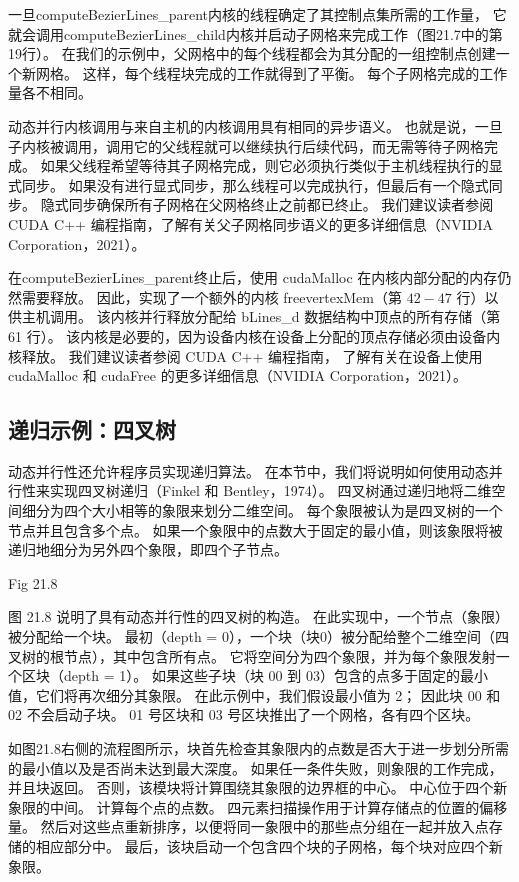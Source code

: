 一旦computeBezierLines\_parent内核的线程确定了其控制点集所需的工作量，
它就会调用computeBezierLines\_child内核并启动子网格来完成工作（图21.7中的第19行）。 
在我们的示例中，父网格中的每个线程都会为其分配的一组控制点创建一个新网格。 这样，每个线程块完成的工作就得到了平衡。 
每个子网格完成的工作量各不相同。

动态并行内核调用与来自主机的内核调用具有相同的异步语义。 
也就是说，一旦子内核被调用，调用它的父线程就可以继续执行后续代码，而无需等待子网格完成。 
如果父线程希望等待其子网格完成，则它必须执行类似于主机线程执行的显式同步。 
如果没有进行显式同步，那么线程可以完成执行，但最后有一个隐式同步。 隐式同步确保所有子网格在父网格终止之前都已终止。 
我们建议读者参阅 CUDA C++ 编程指南，了解有关父子网格同步语义的更多详细信息（NVIDIA Corporation，2021）。

在computeBezierLines\_parent终止后，使用 cudaMalloc 在内核内部分配的内存仍然需要释放。 
因此，实现了一个额外的内核 freevertexMem（第 $42-47$ 行）以供主机调用。 
该内核并行释放分配给 bLines\_d 数据结构中顶点的所有存储（第 61 行）。 
该内核是必要的，因为设备内核在设备上分配的顶点存储必须由设备内核释放。 
我们建议读者参阅 CUDA C++ 编程指南，
了解有关在设备上使用 cudaMalloc 和 cudaFree 的更多详细信息（NVIDIA Corporation，2021）。

\subsection{递归示例：四叉树}
动态并行性还允许程序员实现递归算法。 在本节中，我们将说明如何使用动态并行性来实现四叉树递归（Finkel 和 Bentley，1974）。 
四叉树通过递归地将二维空间细分为四个大小相等的象限来划分二维空间。 每个象限被认为是四叉树的一个节点并且包含多个点。 
如果一个象限中的点数大于固定的最小值，则该象限将被递归地细分为另外四个象限，即四个子节点。

{\color{red} Fig 21.8}

图 21.8 说明了具有动态并行性的四叉树的构造。 在此实现中，一个节点（象限）被分配给一个块。 
最初（depth = 0），一个块（块0）被分配给整个二维空间（四叉树的根节点），其中包含所有点。 
它将空间分为四个象限，并为每个象限发射一个区块（depth = 1）。 
如果这些子块（块 00 到 03）包含的点多于固定的最小值，它们将再次细分其象限。 
在此示例中，我们假设最小值为 2； 因此块 00 和 02 不会启动子块。 01 号区块和 03 号区块推出了一个网格，各有四个区块。

如图21.8右侧的流程图所示，块首先检查其象限内的点数是否大于进一步划分所需的最小值以及是否尚未达到最大深度。 
如果任一条件失败，则象限的工作完成，并且块返回。 否则，该模块将计算围绕其象限的边界框的中心。 中心位于四个新象限的中间。 
计算每个点的点数。 四元素扫描操作用于计算存储点的位置的偏移量。 
然后对这些点重新排序，以便将同一象限中的那些点分组在一起并放入点存储的相应部分中。 
最后，该块启动一个包含四个块的子网格，每个块对应四个新象限。

